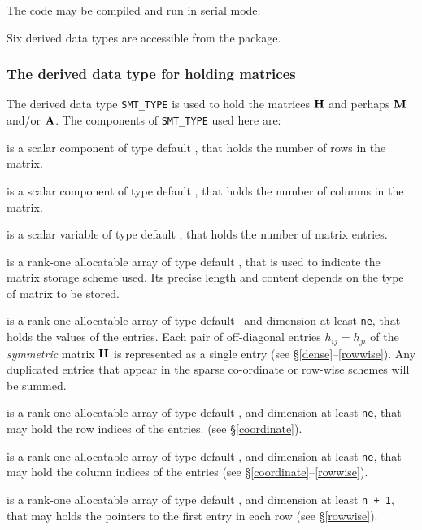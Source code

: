 \documentclass{galahad}
\begin{document}
\noindent
The code may be compiled and run in serial mode.


\galtypes
Six derived data types are accessible from the package.


\subsubsection{The derived data type for holding matrices}\label{typesmt}
The derived data type {\tt SMT\_TYPE} is used to hold the matrices ${\mathbf{H}}$
and perhaps ${\mathbf{M}}$ and/or ${\mathbf{A}}$.
The components of {\tt SMT\_TYPE} used here are:

\begin{description}

 is a scalar component of type default \integer,
that holds the number of rows in the matrix.

 is a scalar component of type default \integer,
that holds the number of columns in the matrix.

 is a scalar variable of type default \integer, that
holds the number of matrix entries.

 is a rank-one allocatable array of type default \character, that
is used to indicate the matrix storage scheme used. Its precise length and
content depends on the type of matrix to be stored.

 is a rank-one allocatable array of type default \realdp\,
and dimension at least {\tt ne}, that holds the values of the entries.
Each pair of off-diagonal entries $h_{ij} = h_{ji}$ of the {\em symmetric}
matrix ${\mathbf{H}}$ is represented as a single entry
(see \S\ref{dense}--\ref{rowwise}).
Any duplicated entries that appear in the sparse
co-ordinate or row-wise schemes will be summed.

 is a rank-one allocatable array of type default \integer,
and dimension at least {\tt ne}, that may hold the row indices of the entries.
(see \S\ref{coordinate}).

 is a rank-one allocatable array of type default \integer,
and dimension at least {\tt ne}, that may hold the column indices of the entries
(see \S\ref{coordinate}--\ref{rowwise}).

 is a rank-one allocatable array of type default \integer,
and dimension at least {\tt n + 1}, that may holds the pointers to
the first entry in each row (see \S\ref{rowwise}).

\end{description}
\end{document}
